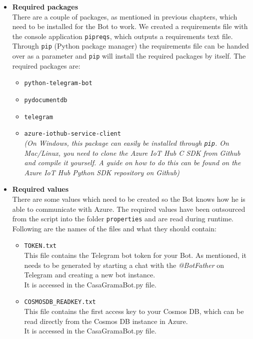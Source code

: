 \documentclass[a4paper]{article}
\begin{document}
			\begin{itemize}
				\item \textbf{Required packages}\\
				There are a couple of packages, as mentioned in previous chapters, which need to be installed for the Bot to work.
				We created a requirements file with the console application \texttt{pipreqs}, which outputs a requirements text file.
				Through \texttt{pip} (Python package manager) the requirements file can be handed over as a parameter and \texttt{pip} will install the required packages by itself.
				The required packages are:
					\begin{itemize}
						\item \texttt{python-telegram-bot}
						
						\item \texttt{pydocumentdb}
						
						\item \texttt{telegram}
						
						\item \texttt{azure-iothub-service-client}\\
						\textit{(On Windows, this package can easily be installed through \texttt{pip}.
						On Mac/Linux, you need to clone the Azure IoT Hub C SDK from Github and compile it yourself.
						A guide on how to do this can be found on the Azure IoT Hub Python SDK repository on Github)}\\
					\end{itemize}
				
				\item \textbf{Required values}\\
				There are some values which need to be created so the Bot knows how he is able to communicate with Azure.
				The required values have been outsourced from the script into the folder \texttt{properties} and are read during runtime.
				Following are the names of the files and what they should contain:\\
					\begin{itemize}
						\item \texttt{TOKEN.txt}\\
						This file contains the Telegram bot token for your Bot.
						As mentioned, it needs to be generated by starting a chat with the \textit{@BotFather} on Telegram and creating a new bot instance.\\
						It is accessed in the CasaGramaBot.py file.
						
						\item \texttt{COSMOSDB\_READKEY.txt}\\
						This file contains the first access key to your Cosmos DB, which can be read directly from the Cosmos DB instance in Azure.\\
						It is accessed in the CasaGramaBot.py file.
						

\end{itemize}
\end{itemize}
\end{document}
